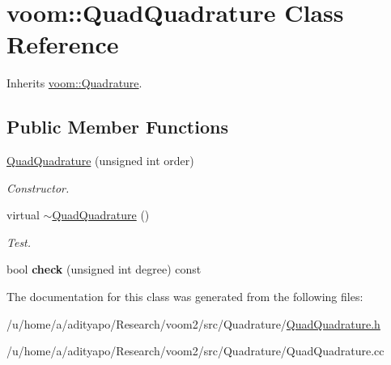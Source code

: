 \hypertarget{classvoom_1_1_quad_quadrature}{
\section{voom::QuadQuadrature Class Reference}
\label{classvoom_1_1_quad_quadrature}
}


Inherits \hyperlink{classvoom_1_1_quadrature}{voom::Quadrature}.\subsection*{Public Member Functions}
\begin{DoxyCompactItemize}
\item 
\hypertarget{classvoom_1_1_quad_quadrature_ad911cb1165ee336da4fc4375b772ca28}{
\hyperlink{classvoom_1_1_quad_quadrature_ad911cb1165ee336da4fc4375b772ca28}{QuadQuadrature} (unsigned int order)}
\label{classvoom_1_1_quad_quadrature_ad911cb1165ee336da4fc4375b772ca28}

\begin{DoxyCompactList}\small\item\em Constructor. \item\end{DoxyCompactList}\item 
\hypertarget{classvoom_1_1_quad_quadrature_ab14e886da0e6b67d44482553b23f9dd2}{
virtual \hyperlink{classvoom_1_1_quad_quadrature_ab14e886da0e6b67d44482553b23f9dd2}{$\sim$QuadQuadrature} ()}
\label{classvoom_1_1_quad_quadrature_ab14e886da0e6b67d44482553b23f9dd2}

\begin{DoxyCompactList}\small\item\em Test. \item\end{DoxyCompactList}\item 
\hypertarget{classvoom_1_1_quad_quadrature_af1a22b14e347ce401638b516f7fc1923}{
bool {\bfseries check} (unsigned int degree) const }
\label{classvoom_1_1_quad_quadrature_af1a22b14e347ce401638b516f7fc1923}

\end{DoxyCompactItemize}


The documentation for this class was generated from the following files:\begin{DoxyCompactItemize}
\item 
/u/home/a/adityapo/Research/voom2/src/Quadrature/\hyperlink{_quad_quadrature_8h}{QuadQuadrature.h}\item 
/u/home/a/adityapo/Research/voom2/src/Quadrature/QuadQuadrature.cc\end{DoxyCompactItemize}
